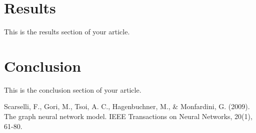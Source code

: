 \documentclass[12pt]{article}
\begin{document}
\section{Results}
This is the results section of your article.

\section{Conclusion}
This is the conclusion section of your article.

\begin{thebibliography}{9}
Scarselli, F., Gori, M., Tsoi, A. C., Hagenbuchner, M., \& Monfardini, G. (2009). The graph neural network model. IEEE Transactions on Neural Networks, 20(1), 61-80.

\end{thebibliography}
\end{document}
